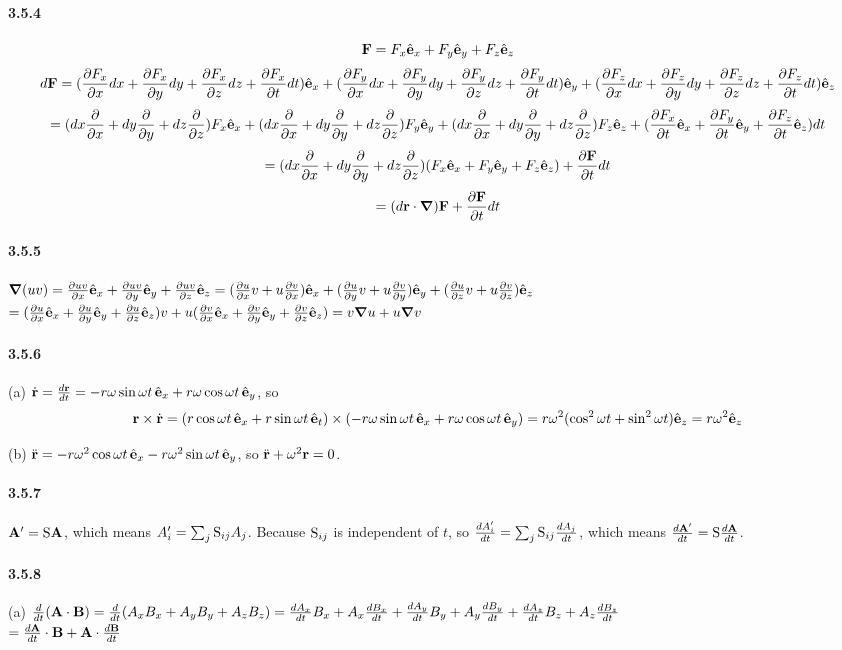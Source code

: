 \documentclass[a4paper]{article}
\begin{document}
\paragraph{3.5.4}
\[\V{F}=F_x\VE_x+F_y\VE_y+F_z\VE_z\]
\[
d\V{F}=(\pdv{F_x}{x}dx+\pdv{F_x}{y}dy+\pdv{F_x}{z}dz+\pdv{F_x}{t}dt)\VE_x+(\pdv{F_y}{x}dx+\pdv{F_y}{y}dy+\pdv{F_y}{z}dz+\pdv{F_y}{t}dt)\VE_y+(\pdv{F_z}{x}dx+\pdv{F_z}{y}dy+\pdv{F_z}{z}dz+\pdv{F_z}{t}dt)\VE_z
\]
\[=
(dx\pdv{}{x}+dy\pdv{}{y}+dz\pdv{}{z})F_x\VE_x+(dx\pdv{}{x}+dy\pdv{}{y}+dz\pdv{}{z})F_y\VE_y+(dx\pdv{}{x}+dy\pdv{}{y}+dz\pdv{}{z})F_z\VE_z+(\pdv{F_x}{t}\VE_x+\pdv{F_y}{t}\VE_y+\pdv{F_z}{t}\VE_z)dt
\]
\[
=(dx\pdv{}{x}+dy\pdv{}{y}+dz\pdv{}{z})(F_x\VE_x+F_y\VE_y+F_z\VE_z)+\pdv{\V{F}}{t}dt
\]
\[
=(d\V{r}\cdot\del)\V{F}+\pdv{\V{F}}{t}dt
\]

\paragraph{3.5.5}
$\del(uv)=\pdv{uv}{x}\VE_x+\pdv{uv}{y}\VE_y+\pdv{uv}{z}\VE_z=(\pdv{u}{x}v+u\pdv{v}{x})\VE_x+(\pdv{u}{y}v+u\pdv{v}{y})\VE_y+(\pdv{u}{z}v+u\pdv{v}{z})\VE_z$\\
$=(\pdv{u}{x}\VE_x+\pdv{u}{y}\VE_y+\pdv{u}{z}\VE_z)v+u(\pdv{v}{x}\VE_x+\pdv{v}{y}\VE_y+\pdv{v}{z}\VE_z)=v\del u+u\del v$

\paragraph{3.5.6}
(a) $\Dot{\V{r}}=\frac{d\V{r}}{dt}=-r\omega\sin{\omega t}\,\VE_x+r\omega\cos{\omega t}\,\VE_y$, so 
\[\V{r}\times\Dot{\V{r}}=(r\cos{\omega t}\,\VE_x+r\sin{\omega t}\,\VE_t)\times(-r\omega\sin{\omega t}\,\VE_x+r\omega\cos{\omega t}\,\VE_y)=r\omega^2(\cos^2{\omega t}+\sin^2{\omega t})\VE_z=r\omega^2\VE_z\]

(b) $\Ddot{\V{r}}=-r\omega^2\cos{\omega t}\,\VE_x-r\omega^2\sin{\omega t}\,\VE_y$, so $\Ddot{\V{r}}+\omega^2\V{r}=0$.

\paragraph{3.5.7}
$\V{A'}=\M{S}\V{A}$, which means $A'_i=\sum_{j}\M{S}_{ij}A_j$. Because $\M{S}_{ij}$ is independent of $t$, so $\frac{dA'_i}{dt}=\sum_{j}\M{S}_{ij}\frac{dA_j}{dt}$, which means $\frac{d\V{A'}}{dt}=\M{S}\frac{d\V{A}}{dt}$.

\paragraph{3.5.8}
(a) $\frac{d}{dt}(\V{A}\cdot\V{B})=\frac{d}{dt}(A_xB_x+A_yB_y+A_zB_z)=\frac{dA_x}{dt}B_x+A_x\frac{dB_x}{dt}+\frac{dA_y}{dt}B_y+A_y\frac{dB_y}{dt}+\frac{dA_z}{dt}B_z+A_z\frac{dB_z}{dt}$\\
$=\frac{d\V{A}}{dt}\cdot\V{B}+\V{A}\cdot\frac{d\V{B}}{dt}$
\medskip
\end{document}
